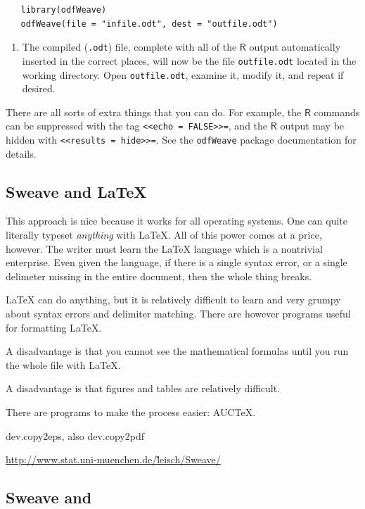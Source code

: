 \documentclass[captions=tableheading]{scrbook}
\begin{document}
\begin{example}
\lstset{language=R}
\begin{lstlisting}
   library(odfWeave)
   odfWeave(file = "infile.odt", dest = "outfile.odt")
\end{lstlisting}
\begin{enumerate}
\item The compiled (\texttt{.odt}) file, complete with all of the \(\mathsf{R}\) output automatically inserted in the correct places, will now be the file \texttt{outfile.odt} located in the working directory. Open \texttt{outfile.odt}, examine it, modify it, and repeat if desired.
\end{enumerate}

There are all sorts of extra things that you can do. For example, the \(\mathsf{R}\) commands can be suppressed with the tag \texttt{<\textcompwordmark{}<echo = FALSE>\textcompwordmark{}>=}, and the \(\mathsf{R}\) output may be hidden with \texttt{<\textcompwordmark{}<results = hide>\textcompwordmark{}>=}. See the \texttt{odfWeave} package documentation for details.
\subsection{Sweave and \protect\LaTeX{}}
\label{sec-22-2-3}


This approach is nice because it works for all operating systems. One can quite literally typeset \emph{anything} with \LaTeX{}. All of this power comes at a price, however. The writer must learn the \LaTeX{} language which is a nontrivial enterprise. Even given the language, if there is a single syntax error, or a single delimeter missing in the entire document, then the whole thing breaks.

\LaTeX{} can do anything, but it is relatively difficult to learn  and very grumpy about syntax errors and delimiter matching. There are however programs useful for formatting \LaTeX{}.

A disadvantage is that you cannot see the mathematical formulas until you run the whole file with \LaTeX{}.

A disadvantage is that figures and tables are relatively difficult.

There are programs to make the process easier: AUC\TeX{}.

dev.copy2eps, also dev.copy2pdf

\href{http://www.stat.uni-muenchen.de/~leisch/Sweave/}{http://www.stat.uni-muenchen.de/\~leisch/Sweave/}
\subsection{Sweave and \protect\LyX{}}
\label{sec-22-2-4}


\end{example}
\end{document}
